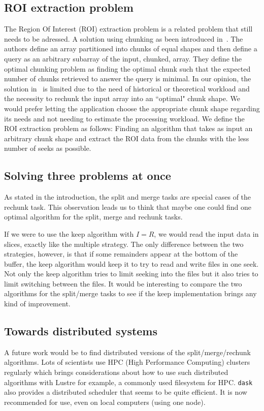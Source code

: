 \documentclass[conference]{IEEEtran}
\begin{document}
\subsection{ROI extraction problem}
The Region Of Interest (ROI) extraction problem is a related problem that still needs
to be adressed. A solution using chunking as been introduced in~\cite{optimal_chuking}. The authors
define an array partitioned into chunks of equal shapes and then define a
query as an arbitrary subarray of the input, chunked, array. They define the
optimal chunking problem as finding the optimal chunk such that the expected
number of chunks retrieved to answer the query is minimal. In our opinion, the
solution in~\cite{optimal_chuking} is limited due to the need of historical or theoretical workload
and the necessity to rechunk the input array into an ``optimal" chunk shape. We
would prefer letting the application choose the appropriate chunk shape
regarding its needs and not needing to estimate the processing workload. We
define the ROI extraction problem as follows: Finding an algorithm that takes
as input an arbitrary chunk shape and extract the ROI data from the chunks with
the less number of seeks as possible.

\subsection{Solving three problems at once}
As stated in the introduction, the split and merge tasks are special cases of
the rechunk task. This observation leads us to think that maybe one could find
one optimal algorithm for the split, merge and rechunk tasks.

If we were to use the keep algorithm with $I=R$, we would read the input data
in slices, exactly like the multiple strategy. The only difference between the
two strategies, however, is that if some remainders appear at the bottom of the
buffer, the keep algorithm would keep it to try to read and write files in one
seek. Not only the keep algorithm tries to limit seeking into the files but it
also tries to limit switching between the files. It would be interesting to
compare the two algorithms for the split/merge tasks to see if the keep
implementation brings any kind of improvement.

\subsection{Towards distributed systems}
A future work would be to find distributed versions of the split/merge/rechunk
algorithms. Lots of scientists use HPC (High Performance Computing) clusters
regularly which brings considerations about how to use such distributed
algorithms with Lustre for example, a commonly used filesystem for HPC. \texttt{dask}
also provides a distributed scheduler that seems to be quite efficient. It is
now recommended for use, even on local computers (using one node).
\end{document}
